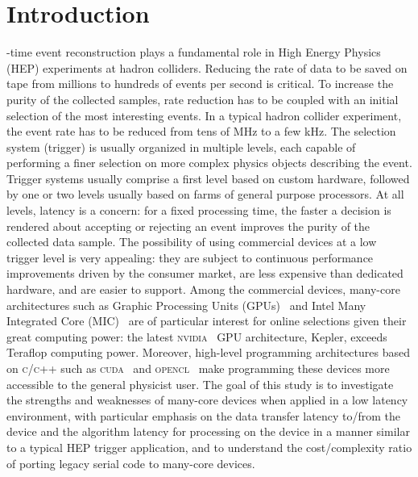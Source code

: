 \documentclass[journal]{IEEEtran}
\begin{document}
\section{Introduction}
-time event reconstruction plays a fundamental role in High Energy
Physics (HEP) experiments at hadron colliders.  Reducing the rate of
data to be saved on tape from millions to hundreds of events per
second is critical. To increase the purity of the collected samples,
rate reduction has to be coupled with an initial selection of the most
interesting events.  In a typical hadron collider experiment, the
event rate has to be reduced from tens of MHz to a few kHz.  The
selection system (trigger) is usually organized in multiple levels,
each capable of performing a finer selection on more complex physics
objects describing the event. Trigger systems usually comprise a first
level based on custom hardware, followed by one or two levels usually
based on farms of general purpose processors.  At all levels, latency
is a concern: for a fixed processing time, the faster a decision is
rendered about accepting or rejecting an event improves the purity of
the collected data sample. The possibility of using commercial devices
at a low trigger level is very appealing: they are subject to
continuous performance improvements driven by the consumer market, are
less expensive than dedicated hardware, and are easier to support.
Among the commercial devices, many-core architectures such as Graphic
Processing Units (GPUs)~\cite{bib_gpu} and Intel Many Integrated Core
(MIC)~\cite{bib_intelMIC} are of particular interest for online
selections given their great computing power: the latest
\textsc{nvidia}~\cite{bib_nvidia} GPU architecture, Kepler, exceeds
Teraflop computing power. Moreover, high-level programming
architectures based on \textsc{c/c++} such as
\textsc{cuda}~\cite{bib_cuda} and \textsc{opencl}~\cite{bib_opencl}
make programming these devices more accessible to the general
physicist user.  The goal of this study is to investigate the
strengths and weaknesses of many-core devices when applied in a low
latency environment, with particular emphasis on the data transfer
latency to/from the device and the algorithm latency for processing on
the device in a manner similar to a typical HEP trigger application,
and to understand the cost/complexity ratio of porting legacy serial
code to many-core devices.
\end{document}
